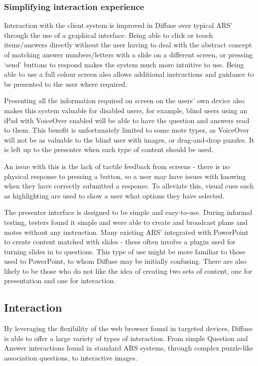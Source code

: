 \documentclass[a4papert,11pt,notitlepage]{ltxdoc}
\begin{document}
\subsubsection{Simplifying interaction experience}
Interaction with the client system is improved in Diffuse over typical ARS' through the use of a graphical interface. Being able to click or touch items/answers directly without the user having to deal with the abstract concept of matching answer numbers/letters with a slide on a different screen, or pressing `send' buttons to respond makes the system much more intuitive to use. Being able to use a full colour screen also allows additional instructions and guidance to be presented to the user where required.

Presenting all the information required on screen on the users' own device also makes this system valuable for disabled users, for example, blind users using an iPad with VoiceOver enabled will be able to have the question and answers read to them. This benefit is unfortunately limited to some mote types, as VoiceOver will not be as valuable to the blind user with images, or drag-and-drop puzzles. It is left up to the presenter when each type of content should be used.

An issue with this is the lack of tactile feedback from screens - there is no physical response to pressing a button, so a user may have issues with knowing when they have correctly submitted a response. To alleviate this, visual cues such as highlighting are used to show a user what options they have selected.

The presenter interface is designed to be simple and easy-to-use. During informal testing, testers found it simple and were able to create and broadcast plans and motes without any instruction. Many existing ARS' integrated with PowerPoint to create content matched with slides - these often involve a plugin used for turning slides in to questions. This type of use might be more familiar to those used to PowerPoint, to whom Diffuse may be initially confusing. There are also likely to be those who do not like the idea of creating two sets of content, one for presentation and one for interaction.

\subsection{Interaction}
By leveraging the flexibility of the web browser found in targeted devices, Diffuse is able to offer a large variety of types of interaction. From simple Question and Answer interactions found in standard ARS systems, through complex puzzle-like association questions, to interactive images.
\end{document}
